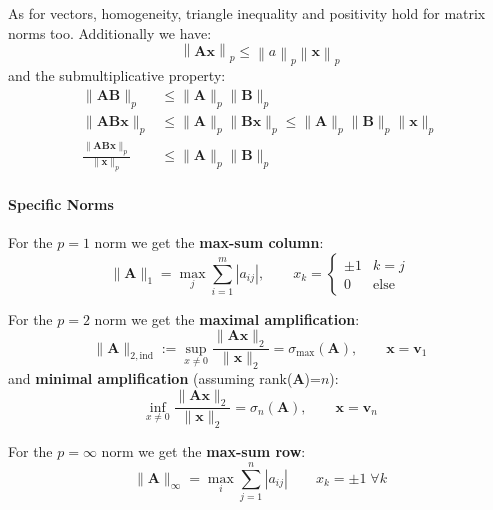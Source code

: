\newpar{}

As for vectors, homogeneity, triangle inequality and positivity hold for matrix norms too. Additionally we have:
\begin{equation*}
    \left\|\mathbf{Ax}\right\|_p\leq\left\|a\right\|_p\left\|\mathbf{x}\right\|_p
\end{equation*}
and the submultiplicative property:
\begin{align*}
    \|\mathbf{AB}\|_p                                     & \leq\|\mathbf{A}\|_p\|\mathbf{B}\|_p                                                      \\
    \|\mathbf{AB} \mathbf{x}\|_p                          & \leq\|\mathbf{A}\|_p\|\mathbf{Bx}\|_p\leq\|\mathbf{A}\|_p\|\mathbf{B}\|_p\|\mathbf{x}\|_p \\
    \frac{\|\mathbf{AB} \mathbf{x}\|_p}{\|\mathbf{x}\|_p} & \leq\|\mathbf{A}\|_p\|\mathbf{B}\|_p
\end{align*}


\paragraph{Specific Norms}


For the $p = 1$ norm we get the \textbf{max-sum column}:
\begin{equation*}
    \|\mathbf{A}\|_1=\max_j\sum_{i=1}^m|a_{ij}|,\qquad x_k=\begin{cases}
        \pm 1 & k=j         \\
        0     & \text{else}
    \end{cases}
\end{equation*}

\newpar{}
For the $p = 2$ norm we get the \textbf{maximal amplification}:
\noindent\begin{equation*}
    \|\mathbf{A}\|_{2,\mathrm{ind}}:=\sup_{x\neq0}\frac{\|\mathbf{Ax}\|_2}{\|\mathbf{x}\|_2}=\sigma_{\max}(\mathbf{A}),\qquad \mathbf{x}=\mathbf{v}_1
\end{equation*}
and \textbf{minimal amplification} (assuming rank($\mathbf{A}$)=$n$):
\noindent\begin{equation*}
    \inf_{x\neq0}\frac{\|\mathbf{Ax}\|_2}{\|\mathbf{x}\|_2}=\sigma_n(\mathbf{A}),\qquad \mathbf{x}=\mathbf{v}_n
\end{equation*}

\newpar{}
For the $p = \infty$ norm we get the \textbf{max-sum row}:
\begin{equation*}
    \|\mathbf{A}\|_\infty=\max_i\sum_{j=1}^n|a_{ij}|\qquad x_k=\pm 1\;\forall k
\end{equation*}

